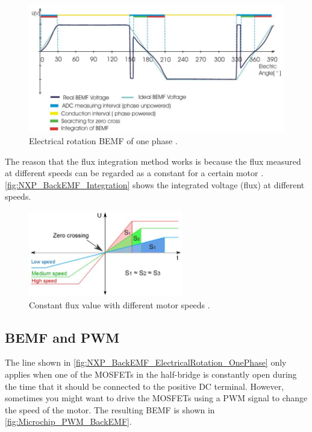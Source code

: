 \documentclass[]{report}
\begin{document}
\begin{figure}[H]
	\centering
	\includegraphics[width=\textwidth]{NXP_BackEMF_ElectricalRotation_OnePhase.JPG}
	\caption{Electrical rotation BEMF of one phase \cite{NXP_AN4597}.}
	\label{fig:NXP_BackEMF_ElectricalRotation_OnePhase}
\end{figure}

The reason that the flux integration method works is because the flux measured at different speeds can be regarded as a constant for a certain motor \cite{NXP_AN4597}. \autoref{fig:NXP_BackEMF_Integration} shows the integrated voltage (flux) at different speeds.

\begin{figure}[H]
	\centering
	\includegraphics[width=0.6\textwidth]{NXP_BackEMF_Integration.JPG}
	\caption{Constant flux value with different motor speeds \cite{NXP_AN4597}.}
	\label{fig:NXP_BackEMF_Integration}
\end{figure}

\subsection{BEMF and PWM}
The line shown in \autoref{fig:NXP_BackEMF_ElectricalRotation_OnePhase} only applies when one of the MOSFETs in the half-bridge is constantly open during the time that it should be connected to the positive DC terminal. However, sometimes you might want to drive the MOSFETs using a PWM signal to change the speed of the motor. The resulting BEMF is shown in \autoref{fig:Microchip_PWM_BackEMF}.
\end{document}
